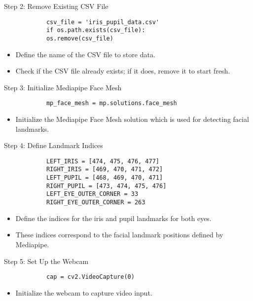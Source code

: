 \documentclass{beamer}
\begin{document}
	\begin{frame}[fragile]{Step 2: Remove Existing CSV File}
		\tiny
		\begin{verbatim}
			csv_file = 'iris_pupil_data.csv'
			if os.path.exists(csv_file):
			os.remove(csv_file)
		\end{verbatim}
		\begin{itemize}
			\item Define the name of the CSV file to store data.
			\item Check if the CSV file already exists; if it does, remove it to start fresh.
		\end{itemize}
	\end{frame}
	
	\begin{frame}[fragile]{Step 3: Initialize Mediapipe Face Mesh}
		\tiny
		\begin{verbatim}
			mp_face_mesh = mp.solutions.face_mesh
		\end{verbatim}
		\begin{itemize}
			\item Initialize the Mediapipe Face Mesh solution which is used for detecting facial landmarks.
		\end{itemize}
	\end{frame}
	
	\begin{frame}[fragile]{Step 4: Define Landmark Indices}
		\tiny
		\begin{verbatim}
			LEFT_IRIS = [474, 475, 476, 477]
			RIGHT_IRIS = [469, 470, 471, 472]
			LEFT_PUPIL = [468, 469, 470, 471]
			RIGHT_PUPIL = [473, 474, 475, 476]
			LEFT_EYE_OUTER_CORNER = 33
			RIGHT_EYE_OUTER_CORNER = 263
		\end{verbatim}
		\begin{itemize}
			\item Define the indices for the iris and pupil landmarks for both eyes.
			\item These indices correspond to the facial landmark positions defined by Mediapipe.
		\end{itemize}
	\end{frame}
	
	\begin{frame}[fragile]{Step 5: Set Up the Webcam}
		\tiny
		\begin{verbatim}
			cap = cv2.VideoCapture(0)
		\end{verbatim}
		\begin{itemize}
			\item Initialize the webcam to capture video input.
		\end{itemize}
	\end{frame}
	
\end{document}

